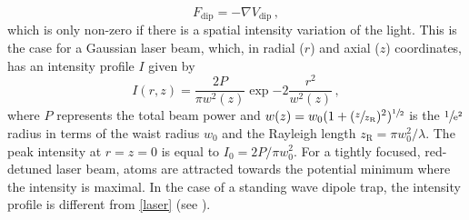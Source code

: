 \documentclass[../Thesis-IJspeert.tex]{subfiles}
\begin{document}
\begin{equation}
F_\text{dip}=-\nabla V_\text{dip}\,,
\end{equation}
which is only non-zero if there is a spatial intensity variation of the light. This is the case for a Gaussian laser beam, which, in radial ($r$) and axial ($z$) coordinates, has an intensity profile $I$ given by
\begin{equation}
\label{laser}
I(r,z)=\frac{2P}{\pi w^2(z)}\exp{-2\frac{r^2}{w^2(z)}}\,,
\end{equation}
where $P$ represents the total beam power and $w(z)=w_0(1+(\sfrac{z}{z_\mathrm{R}})^2)^{\sfrac{1}{2}}$ is the $\sfrac{1}{\mathrm{e}^2}$ radius in terms of the waist radius $w_0$ and the Rayleigh length $z_\mathrm{R}=\pi w^2_0/\lambda$. The peak intensity at $r=z=0$ is equal to $I_0=2P/\pi w_0^2$. For a tightly focused, red-detuned laser beam, atoms are attracted towards the potential minimum where the intensity is maximal. In the case of a standing wave dipole trap, the intensity profile is different from \autoref{laser} (see \cite{Alt2003}).
\end{document}
